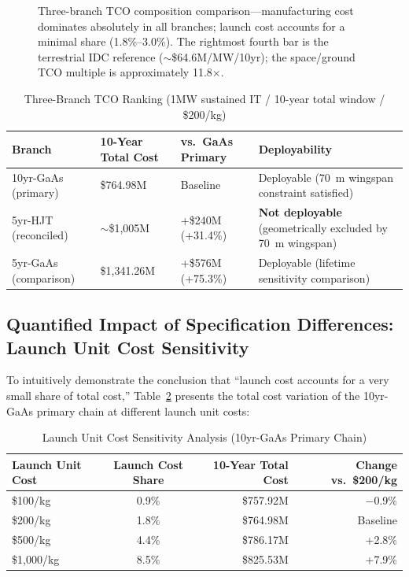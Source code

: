 \begin{figure}[H]
\centering

\caption{Three-branch TCO composition comparison---manufacturing cost dominates absolutely in all branches; launch cost accounts for a minimal share (1.8\%--3.0\%). The rightmost fourth bar is the terrestrial IDC reference ($\sim$\$64.6M/MW/10yr); the space/ground TCO multiple is approximately 11.8$\times$.}
\label{fig:tco_branches}
\end{figure}

\begin{table}[H]
\centering
\caption{Three-Branch TCO Ranking (1\;MW sustained IT / 10-year total window / \$200/kg)}
\label{tab:tco_ranking}
\begin{tabularx}{\textwidth}{
  >{\raggedright\arraybackslash}p{2.9cm}
  >{\centering\arraybackslash}p{2.3cm}
  >{\centering\arraybackslash}p{2.7cm}
  >{\raggedright\arraybackslash}X
}
\toprule
\textbf{Branch} & \textbf{10-Year Total Cost} & \textbf{vs.\ GaAs Primary} & \textbf{Deployability} \\
\midrule
10yr-GaAs (primary) & \$764.98M   & Baseline              & Deployable (70~m wingspan constraint satisfied) \\
5yr-HJT (reconciled)   & $\sim$\$1,005M & +\$240M (+31.4\%)  & \textbf{Not deployable} (geometrically excluded by 70~m wingspan) \\
5yr-GaAs (comparison)  & \$1,341.26M & +\$576M (+75.3\%)  & Deployable (lifetime sensitivity comparison) \\
\bottomrule
\end{tabularx}
\end{table}

\subsection{Quantified Impact of Specification Differences: Launch Unit Cost Sensitivity}

To intuitively demonstrate the conclusion that ``launch cost accounts for a very small share of total cost,'' Table~\ref{tab:launch_sensitivity} presents the total cost variation of the 10yr-GaAs primary chain at different launch unit costs:

\begin{table}[H]
\centering
\small
\caption{Launch Unit Cost Sensitivity Analysis (10yr-GaAs Primary Chain)}
\label{tab:launch_sensitivity}
\begin{tabular}{lcrr}
\toprule
\textbf{Launch Unit Cost} & \textbf{Launch Cost Share} & \textbf{10-Year Total Cost} & \textbf{Change vs.\ \$200/kg} \\
\midrule
\$100/kg  & 0.9\%  & \$757.92M & $-$0.9\% \\
\$200/kg  & 1.8\%  & \$764.98M & Baseline \\
\$500/kg  & 4.4\%  & \$786.17M & +2.8\% \\
\$1,000/kg & 8.5\% & \$825.53M & +7.9\% \\
\bottomrule
\end{tabular}
\end{table}


